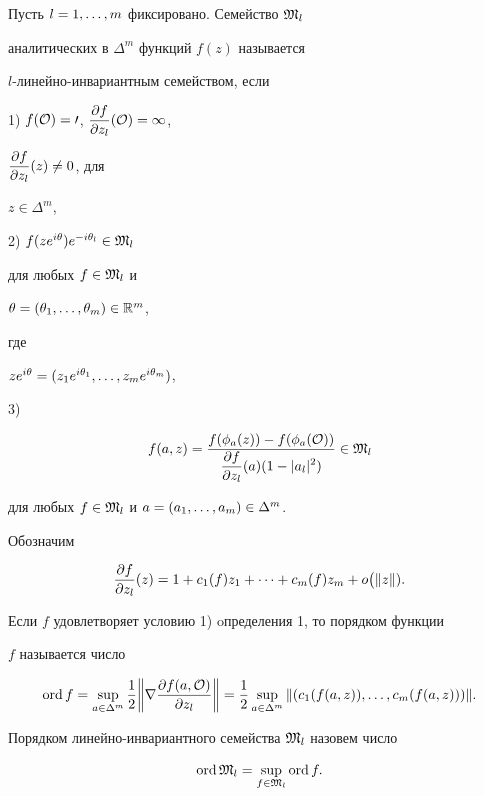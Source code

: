 \begin{defn}


Пусть $l=1,\dotsc,m$ фиксировано. Семейство $\frak M_l$


аналитических в $\Delta^m $ функций $f(z)$ называется


$l$-линейно-инвариантным семейством, если





1) $f(\cal O)=0$, $\displaystyle \frac{\partial f}{\partial z_l} (\cal O)=1$,


$\displaystyle \frac{\partial f}{\partial z_l} (z)\neq 0$, для


$z\in\Delta^m$,





2) $f(ze^{i\theta})e^{-i\theta_l}\in\frak M_l$


для любых $f\in\frak M_l$ и


$\theta = (\theta_1,\dotsc,\theta_m)\in \Bbb R^m$,


где


$ze^{i\theta}=(z_1e^{i\theta_1},\dotsc,z_me^{i\theta_m})$,





3) 


$$


f(a,z)=\frac{f(\phi_a(z))-f(\phi_a(\cal O))}{\displaystyle \pol (a)


(1-|a_l|^2)} \in \frak M_l


$$


для любых $f\in\frak M_l$ и $a=(a_1,\dotsc,a_m)\in\Delta^m$.


\end{defn}





Обозначим


$$


\pol (z)=1+c_1(f)z_1+\dotsb +c_m(f)z_m+ o\bigl(\|z\|).


$$





\begin{defn}


Если $f$ удовлетворяет условию 1) oпределения 1, то порядком функции


$f$ называется число


$$


\ord f=\sup_{a\in\Delta^m}\frac{1}{2}


\bigg\|\nabla\frac{\partial f(a,\cal O)}{\partial z_l}\bigg\|=\frac


12\sup_{a\in\Delta^m}\|(c_1(f(a,z)),\cd,c_m(f(a,z)))\|.


$$


Порядком линейно-инвариантного семейства $\frak M_l$ назовем число


$$


\ord\frak M_l=\sup_{f\in\frak M_l}\ord f.


$$


\end{defn}





